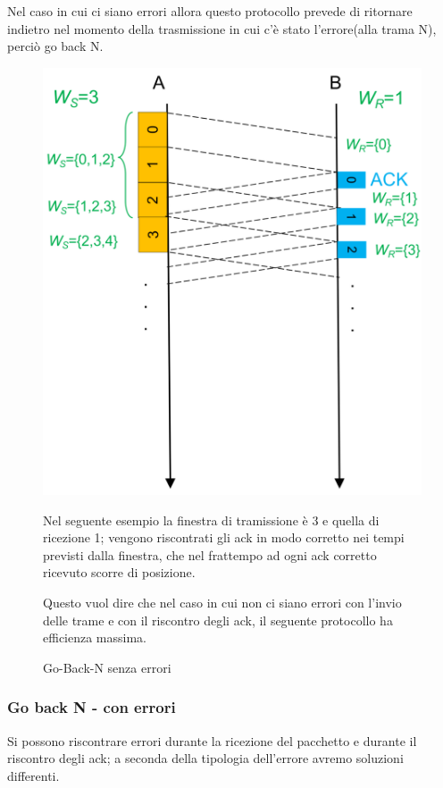 Nel caso in cui ci siano errori allora questo protocollo prevede di ritornare indietro nel momento della trasmissione in cui c'è stato l'errore(alla trama N), perciò go back N.
\begin{figure}[htbp]
    \centering
    \begin{minipage}{0.4\textwidth}
        \includegraphics[width=\linewidth]{images/gobackinsenzaerrori.png}
        \caption{Go-Back-N senza errori}
    \end{minipage}%
    \hfill
    \begin{minipage}{0.55\textwidth}
        Nel seguente esempio la finestra di tramissione è 3 e quella di ricezione 1; vengono riscontrati gli ack in modo corretto nei tempi previsti dalla finestra, che nel frattempo ad ogni ack corretto ricevuto scorre di posizione.
        
        Questo vuol dire che nel caso in cui non ci siano errori con l'invio delle trame e con il riscontro degli ack, il seguente protocollo ha efficienza massima.
 
    \end{minipage}
\end{figure}
 \newpage
\subsubsection{Go back N - con errori}
Si possono riscontrare errori durante la ricezione del pacchetto e durante il riscontro degli ack; a seconda della tipologia dell'errore avremo soluzioni differenti.

